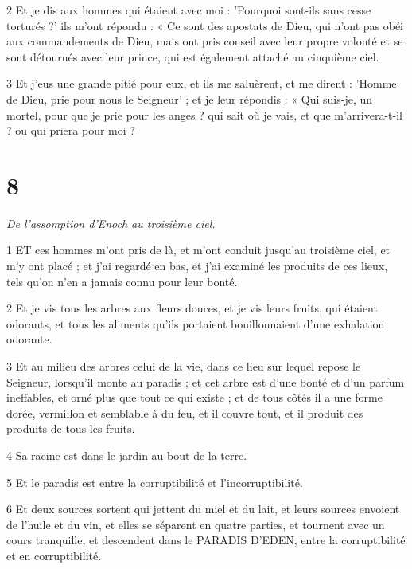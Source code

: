 \par 2 Et je dis aux hommes qui étaient avec moi : 'Pourquoi sont-ils sans cesse torturés ?' ils m'ont répondu : « Ce sont des apostats de Dieu, qui n'ont pas obéi aux commandements de Dieu, mais ont pris conseil avec leur propre volonté et se sont détournés avec leur prince, qui est également attaché au cinquième ciel.

\par 3 Et j'eus une grande pitié pour eux, et ils me saluèrent, et me dirent : 'Homme de Dieu, prie pour nous le Seigneur' ; et je leur répondis : « Qui suis-je, un mortel, pour que je prie pour les anges ? qui sait où je vais, et que m'arrivera-t-il ? ou qui priera pour moi ?

\chapter{8}

\par \textit{De l'assomption d'Enoch au troisième ciel.}

\par 1 ET ces hommes m'ont pris de là, et m'ont conduit jusqu'au troisième ciel, et m'y ont placé ; et j'ai regardé en bas, et j'ai examiné les produits de ces lieux, tels qu'on n'en a jamais connu pour leur bonté.

\par 2 Et je vis tous les arbres aux fleurs douces, et je vis leurs fruits, qui étaient odorants, et tous les aliments qu'ils portaient bouillonnaient d'une exhalation odorante.

\par 3 Et au milieu des arbres celui de la vie, dans ce lieu sur lequel repose le Seigneur, lorsqu'il monte au paradis ; et cet arbre est d'une bonté et d'un parfum ineffables, et orné plus que tout ce qui existe ; et de tous côtés il a une forme dorée, vermillon et semblable à du feu, et il couvre tout, et il produit des produits de tous les fruits.

\par 4 Sa racine est dans le jardin au bout de la terre.

\par 5 Et le paradis est entre la corruptibilité et l'incorruptibilité.

\par 6 Et deux sources sortent qui jettent du miel et du lait, et leurs sources envoient de l'huile et du vin, et elles se séparent en quatre parties, et tournent avec un cours tranquille, et descendent dans le PARADIS D'EDEN, entre la corruptibilité et en corruptibilité.

